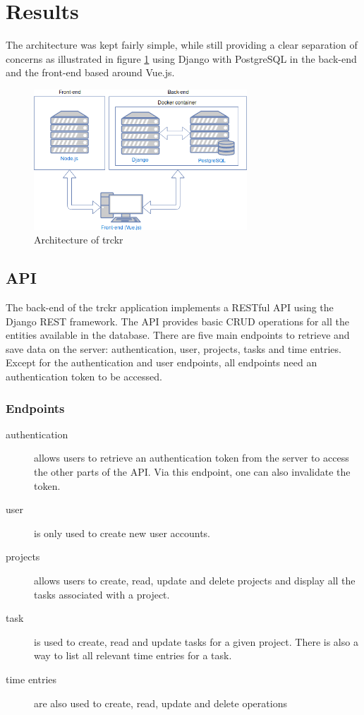 \documentclass[bibliography=totoc, listof=totocnumbered]{scrartcl}
\begin{document}
\section{Results}
The architecture was kept fairly simple, while still providing a clear
separation of concerns as illustrated in figure \ref{fig:architecture} using
Django with PostgreSQL in the back-end and the front-end based around Vue.js.

\begin{figure}[h]
    \includegraphics[width=8cm]{architecture}
    \caption{Architecture of trckr}
    \label{fig:architecture}
\end{figure}

\subsection{API}
The back-end of the trckr application implements a RESTful API using the Django
REST framework. The API provides basic CRUD operations for all the entities
available in the database. There are five main endpoints to retrieve and save
data on the server: authentication, user, projects, tasks and time entries.
Except for the authentication and user endpoints, all endpoints need an
authentication token to be accessed.

\subsubsection{Endpoints}
\begin{description}
\item[authentication] allows users to retrieve an authentication token from the
  server to access the other parts of the API. Via this endpoint, one can also
  invalidate the token.
\item[user] is only used to create new user accounts.
\item[projects] allows users to create, read, update and delete projects and
  display all the tasks associated with a project.
\item[task] is used to create, read and update tasks for a given project. There
  is also a way to list all relevant time entries for a task.
\item[time entries] are also used to create, read, update and delete operations
\end{description}
\end{document}
